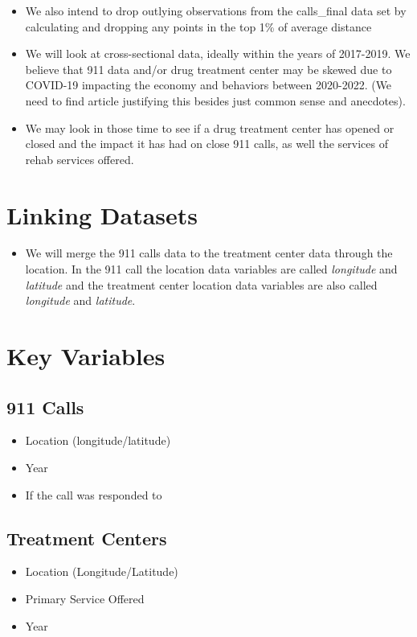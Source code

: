 \documentclass[12pt]{article}
\begin{document}
\begin{itemize}
\item We also intend to drop outlying observations from the calls\_final data set by calculating and dropping any points in the top 1\% of average distance
\item We will look at cross-sectional data, ideally within the years of 2017-2019. We believe that 911 data and/or drug treatment center may be skewed due to COVID-19 impacting the economy and behaviors between 2020-2022. (We need to find article justifying this besides just common sense and anecdotes). 
\item We may look in those time to see if a drug treatment center has opened or closed and the impact it has had on close 911 calls, as well the services of rehab services offered. 
\end{itemize}

\section{Linking Datasets}
\label{sec:discussion}

\begin{itemize}
    \item We will merge the 911 calls data to the treatment center data through the location. In the 911 call the location data variables are called \textit{longitude} and \textit{latitude} and the treatment center location data variables are also called \textit{longitude} and \textit{latitude}.
\end{itemize}


\section{Key Variables}
\label{sec:result}

\subsection{911 Calls}
\begin{itemize}
    \item Location (longitude/latitude)
    \item Year
    \item If the call was responded to
\end{itemize}

\subsection{Treatment Centers}
\begin{itemize}
    \item Location (Longitude/Latitude)
    \item Primary Service Offered
    \item Year
\end{itemize}
\end{document}
